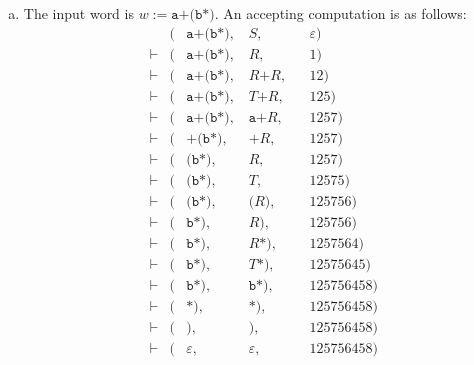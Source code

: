\begin{solution}
\begin{enumerate}[(a)]
\item The input word is $w := \texttt{a+(b*)}$.
    An accepting computation is as follows:
    \begin{align*}
           & (&\texttt{a+(b*)},\; & S,                       &&\varepsilon) \\
    \vdash & (&\texttt{a+(b*)},\; & R,                       &&1) \\
    \vdash & (&\texttt{a+(b*)},\; & R \texttt{+} R,          &&12) \\
    \vdash & (&\texttt{a+(b*)},\; & T \texttt{+} R,          &&125) \\
    \vdash & (&\texttt{a+(b*)},\; & \texttt{a+} R,           &&1257) \\
    \vdash & (&\texttt{+(b*)},\;  & \texttt{+} R,            &&1257) \\
    \vdash & (&\texttt{(b*)},\;   & R,                       &&1257) \\
    \vdash & (&\texttt{(b*)},\;   & T,                       &&12575) \\
    \vdash & (&\texttt{(b*)},\;   & \texttt{(} R \texttt{)}, &&125756) \\
    \vdash & (&\texttt{b*)},\;    & R \texttt{)},            &&125756) \\
    \vdash & (&\texttt{b*)},\;    & R \texttt{*)},           &&1257564) \\
    \vdash & (&\texttt{b*)},\;    & T \texttt{*)},           &&12575645) \\
    \vdash & (&\texttt{b*)},\;    & \texttt{b*)},            &&125756458) \\
    \vdash & (&\texttt{*)},\;     & \texttt{*)},             &&125756458) \\
    \vdash & (&\texttt{)},\;      & \texttt{)},              &&125756458) \\
    \vdash & (&\varepsilon,\;     & \varepsilon,             &&125756458)
    \end{align*}



\end{enumerate}
\end{solution}

